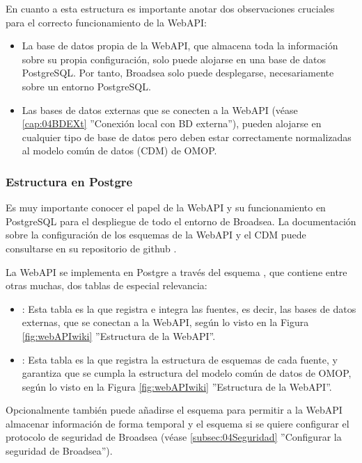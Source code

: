 En cuanto a esta estructura es importante anotar dos observaciones cruciales para el correcto funcionamiento de la WebAPI:

\begin{itemize}
     \item La base de datos propia de la WebAPI, que almacena toda la información sobre su propia configuración, solo puede alojarse en una base de datos PostgreSQL. Por tanto, Broadsea solo puede desplegarse, necesariamente sobre un entorno PostgreSQL.
    \item Las bases de datos externas que se conecten a la WebAPI (véase \ref{cap:04BDEXt} ''Conexión local con BD externa''), pueden alojarse en cualquier tipo de base de datos pero deben estar correctamente normalizadas al modelo común de datos (CDM) de OMOP. 

\end{itemize}

\subsubsection{Estructura en Postgre}

Es muy importante conocer el papel de la WebAPI y su funcionamiento en PostgreSQL para el despliegue de todo el entorno de Broadsea. La documentación sobre la configuración de los esquemas de la WebAPI y el CDM puede consultarse en su repositorio de github \cite{githubCDMConfig}.

La WebAPI se implementa en Postgre a través del esquema , que contiene entre otras muchas, dos tablas de especial relevancia: 

\begin{itemize}
    \item \textbf{}: Esta tabla es la que registra e integra las fuentes, es decir, las bases de datos externas, que se conectan a la WebAPI, según lo visto en la Figura \ref{fig:webAPIwiki} ''Estructura de la WebAPI''.
    \item \textbf{}: Esta tabla es la que registra la estructura de esquemas de cada fuente, y garantiza que se cumpla la estructura del modelo común de datos de OMOP, según lo visto en la Figura \ref{fig:webAPIwiki} ''Estructura de la WebAPI''.
\end{itemize}

Opcionalmente también puede añadirse el esquema  para permitir a la WebAPI almacenar información de forma temporal y el esquema  si se quiere configurar el protocolo de seguridad de Broadsea (véase \ref{subsec:04Seguridad} ''Configurar la seguridad de Broadsea'').

